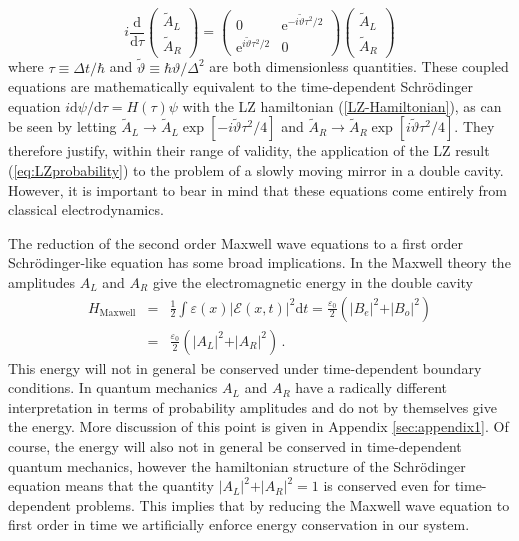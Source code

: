 \documentclass[twocolumn,english,pra,aps,superscriptaddress,floatfix]{revtex4-1}
\begin{document}
\begin{equation}
i\frac{\mathrm{d}}{\mathrm{d} \tau}\left(\begin{array}{c} \tilde{A}_{L}  \\  \tilde{A}_{R} \end{array}\right)=\left(\begin{array}{cc}0 & \mathrm{e}^{-i \tilde{\vartheta} \tau^2/2} \\ \mathrm{e}^{i \tilde{\vartheta} \tau^2 /2} & 0\end{array}\right)\left(\begin{array}{c}\tilde{A}_{L}  \\ \tilde{A}_{R}\end{array}\right)
\label{eq:schrod}
\end{equation}
where $\tau \equiv \Delta t / \hbar$ and $\tilde{\vartheta} \equiv \hbar \vartheta / \Delta^2 $ are both dimensionless quantities. These coupled equations are mathematically equivalent to the time-dependent Schr\"{o}dinger equation $i \mathrm{d} \psi / \mathrm{d}\tau = H(\tau) \psi$ with the LZ hamiltonian (\ref{LZ-Hamiltonian}), as can be seen by letting $\tilde{A}_{L} \rightarrow \tilde{A}_{L} \exp [-i \tilde{\vartheta} \tau^2/4]$ and $\tilde{A}_{R} \rightarrow \tilde{A}_{R} \exp [i \tilde{\vartheta} \tau^2/4]$. They therefore justify, within their range of validity, the application of the LZ result (\ref{eq:LZprobability}) to the problem of a slowly moving mirror in a double cavity. However, it is important to bear in mind that these equations come entirely from classical electrodynamics. 


The reduction of the second order Maxwell wave equations to a first order Schr\"{o}dinger-like equation has some broad implications. In the Maxwell theory the amplitudes $A_{L}$ and $A_{R}$ give the electromagnetic energy in the double cavity
\begin{eqnarray}
H_{\mathrm{Maxwell}} & = & \frac{1}{2}\int \varepsilon(x) \vert \mathcal{E}(x,t) \vert^{2} \mathrm{d} t= \frac{\varepsilon_{0}}{2}\left( \vert B_{e} \vert^2 + \vert B_{o}\vert^2 \right) \nonumber \\
& = & \frac{\varepsilon_{0}}{2}\left( \vert A_{L} \vert^2 + \vert A_{R}\vert^2 \right) \, . \label{eq:energy}
\end{eqnarray} 
This energy will not in general be conserved under time-dependent boundary conditions. In quantum mechanics $A_{L}$ and $A_{R}$ have a radically different interpretation in terms of probability amplitudes and do not by themselves give the energy. More discussion of this point is given in Appendix \ref{sec:appendix1}. Of course, the energy will also not in general be conserved in time-dependent quantum mechanics, however the hamiltonian structure of the Schr\"{o}dinger equation means that the quantity $\vert A_{L} \vert^2 +\vert A_{R} \vert^2 =1$ is conserved even for time-dependent problems. This implies that by reducing the Maxwell wave equation to first order in time we artificially enforce energy conservation in our system. 
\end{document}
